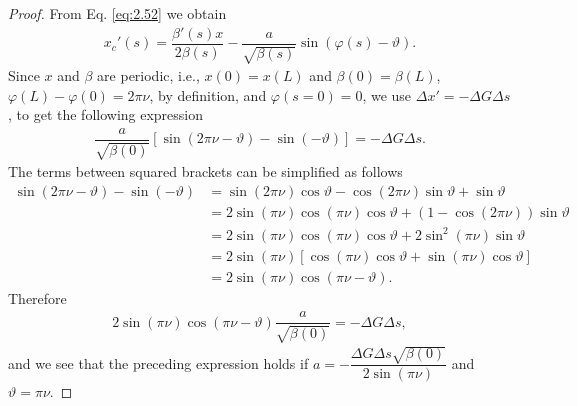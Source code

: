 \begin{proof}
From Eq. \eqref{eq:2.52} we obtain
\begin{align*}
x_c'(s) =\dfrac{\beta'(s)x}{2\beta(s)} - \dfrac{a}{\sqrt{\beta(s)}}\sin\left(\varphi(s) - \vartheta\right).
\end{align*}
Since $x$ and $\beta$ are periodic, i.e., $x(0)=x(L)$ and $\beta(0) = \beta(L)$, $\varphi(L) - \varphi(0) = 2 \pi \nu$, by definition, and $\varphi(s=0)=0$, we use $\Delta x' = -\Delta G \Delta s$,
to get the following expression
\begin{align*}
\dfrac{a}{\sqrt{\beta(0)}}\left[\sin(2\pi \nu - \vartheta) - \sin(-\vartheta)\right] = -\Delta G \Delta s.
\end{align*}
The terms between squared brackets can be simplified as follows
\begin{align*}
\sin(2\pi \nu - \vartheta) - \sin(-\vartheta) &= \sin(2\pi \nu)\cos\vartheta - \cos(2\pi \nu)\sin \vartheta + \sin \vartheta\\
                                         &= 2\sin(\pi \nu)\cos(\pi \nu)\cos\vartheta + \left(1-\cos(2\pi \nu)\right)\sin\vartheta\\
                                           &= 2\sin(\pi \nu)\cos(\pi \nu)\cos\vartheta + 2\sin^2(\pi \nu)\sin\vartheta\\
                                           &= 2\sin(\pi\nu)\left[\cos(\pi\nu)\cos\vartheta + \sin(\pi\nu)\cos\vartheta\right] \\
                                           &=  2\sin(\pi\nu)\cos(\pi\nu - \vartheta).
\end{align*}
Therefore
\begin{align*}
2\sin(\pi\nu)\cos(\pi\nu - \vartheta)\dfrac{a}{\sqrt{\beta(0)}} = -\Delta G \Delta s,
\end{align*}
and we see that the preceding expression holds if $a = -\dfrac{\Delta G \Delta s \sqrt{\beta(0)}}{2 \sin{(\pi\nu)}}$ and $\vartheta = \pi \nu$.
\end{proof}

